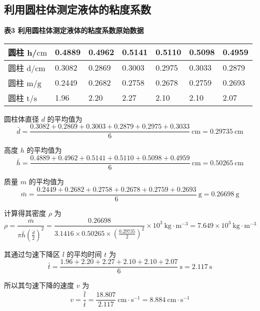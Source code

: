 \documentclass[10pt,a4paper]{article}	%
\makeatletter
\newenvironment{tablehere}
{\def\@captype{table}}
{}
\makeatother
\begin{document}
	\subsection{利用圆柱体测定液体的粘度系数}

	\begin{tablehere}
		\caption*{\bf 表3 利用圆柱体测定液体的粘度系数原始数据}
		\noindent
		\begin{center}
			\begin{tabularx}{0.95\linewidth}{|Y|Y|Y|Y|Y|Y|Y|}
				\hline
				圆柱 h/$\mathrm {cm}$ & 0.4889 & 0.4962 & 0.5141 & 0.5110 & 0.5098 & 0.4959 \\ \hline
				圆柱 d/$\mathrm {cm}$ & 0.3082 & 0.2869 & 0.3003 & 0.2975 & 0.3033 & 0.2879 \\ \hline
				圆柱 m/$\mathrm {g}$  & 0.2449 & 0.2682 & 0.2758 & 0.2678 & 0.2759 & 0.2693 \\ \hline
				圆柱 t/$\mathrm {s}$  & 1.96   & 2.20   & 2.27   & 2.10   & 2.10   & 2.07   \\ \hline
				\end{tabularx}
		\end{center}
		\vspace*{1em}
	\end{tablehere}




	
圆柱体直径 $d$ 的平均值为
$$
\bar{d}=\frac{0.3082 +0.2869+0.3003+0.2879+0.2975+0.3033}{6} \mathrm{~cm}=0.29735 \mathrm{~cm}
$$

高度 $h$ 的平均值为
$$
\bar{h}=\frac{0.4889 +0.4962 +0.5141 +0.5110+ 0.5098+ 0.4959}{6} \mathrm{~cm}=0.50265 \mathrm{~cm}
$$

质量 $m$ 的平均值为
$$
\bar{m}=\frac{0.2449 +0.2682 +0.2758 +0.2678 +0.2759+ 0.2693}{6} \mathrm{~g}=0.26698 \mathrm{~g}
$$

计算得其密度 $\rho$ 为
$$
\rho=\frac{\bar{m}}{\pi \bar{h} \left(\frac{\bar{d}}{2}\right)^2}=\frac{0.26698}{ 3.1416 \times 0.50265\times\left(\frac{0.29735}{2}\right)^2} \times 10^3 \mathrm{~kg} \cdot \mathrm{m}^{-3}=7.649 \times 10^3 \mathrm{~kg} \cdot \mathrm{m}^{-3}
$$

其通过匀速下降区 $l$ 的平均时间 $t$ 为
$$
\bar{t}=\frac{1.96 +2.20 +2.27 +2.10 +2.10 +2.07}{6} \mathrm{~s}=2.117\mathrm{~s}
$$

所以其匀速下降的速度 $v$ 为
$$
v=\frac{\bar{l}}{\bar{t}}=\frac{18.807}{2.117} \mathrm{~cm} \cdot \mathrm{s}^{-1}=8.884 \mathrm{~cm} \cdot \mathrm{s}^{-1}
$$
\end{document}
